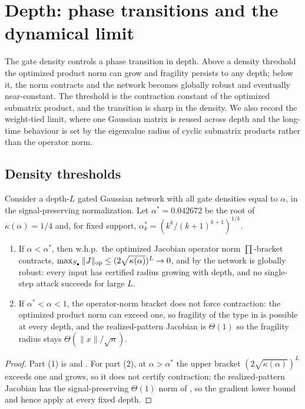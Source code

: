\section{Depth: phase transitions and the dynamical limit}\label{sec:depth}

The gate density controls a phase transition in depth. Above a density threshold the optimized product
norm can grow and fragility persists to any depth; below it, the norm contracts and the network becomes
globally robust and eventually near-constant. The threshold is the contraction constant of the
optimized submatrix product, and the transition is sharp in the density. We also record the
weight-tied limit, where one Gaussian matrix is reused across depth and the long-time behaviour is set
by the eigenvalue radius of cyclic submatrix products rather than the operator norm.

\subsection{Density thresholds}
\begin{theorem}\label{thm:phase}
Consider a depth-$L$ gated Gaussian network with all gate densities equal to $\alpha$, in the
signal-preserving normalization. Let $\alpha^*=0.042672$ be the root of $\kappa(\alpha)=1/4$ and, for
fixed support, $\alpha^*_k=(k^k/(k+1)^{k+1})^{1/k}$.
\begin{enumerate}
\item If $\alpha<\alpha^*$, then w.h.p.\ the optimized Jacobian operator norm $\prod$-bracket
contracts, $\max_{S_\bullet}\|J\|_{\mathrm{op}}\le(2\sqrt{\kappa(\alpha)})^L\to0$, and by 
the network is globally robust: every input has certified radius growing with depth, and no
single-step attack succeeds for large $L$.
\item If $\alpha^*<\alpha<1$, the operator-norm bracket does not force contraction: the optimized
product norm can exceed one, so fragility of the type in  is possible at every depth,
and the realized-pattern Jacobian is $\Theta(1)$ so the fragility radius stays $\Theta(\|x\|/\sqrt n)$.
\end{enumerate}
\end{theorem}

\begin{proof}
Part (1) is  and . For part (2), at $\alpha>\alpha^*$ the
upper bracket $(2\sqrt{\kappa(\alpha)})^L$ exceeds one and grows, so it does not certify contraction;
the realized-pattern Jacobian has the signal-preserving $\Theta(1)$ norm of , so the
gradient lower bound and hence  apply at every fixed depth.
\end{proof}

